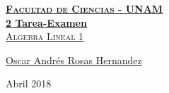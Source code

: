 \documentclass[12pt, fleqn]{article}                             %
\author{Oscar Andrés Rosas}                                     %
\theoremstyle{break}                                            %
\begin{document}
\begin{titlepage}
    
    \pagecolor{TitlePageColor}                                      %
    \color{white}                                                   %

    \vspace                                                         %
    \baselineskip                                                   %

    \makebox[0pt][l]{\rule{1.3\textwidth}{3pt}}                     %
    
    \href{https://compilandoconocimiento.com}                       %
    {\textbf{\textsc{\Huge Facultad de Ciencias - UNAM}}}\\[2.7cm]  %

    \href{\ProjectNameLink/LibroAlgebraLineal}                      %
    {\fontsize{65}{78}\selectfont \textbf{2 Tarea-Examen}\\[0.5cm]  %
    \textcolor{ColorSubtext}{\textsc{\Huge Algebra Lineal 1 }}}     %
    
    \vfill                                                          %
    
    \href{\ProjectAuthorLink}                                       %
    {\LARGE \textsf{Oscar Andrés Rosas Hernandez}}                  %

    \vspace                                                         %
    \baselineskip                                                   %
    
    {\large \textsf{Abril 2018}}                                    %

\end{titlepage}
\end{document}
